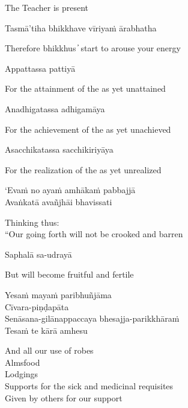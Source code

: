 \begin{cprenglish}
  The Teacher is present
\end{cprenglish}

Tasmā’tiha bhikkhave vīriyaṁ ārabhatha

\begin{cprenglish}
  Therefore bhikkhus  ̓  start to arouse your energy
\end{cprenglish}

Appattassa pattiyā

\begin{cprenglish}
  For the attainment of the as yet unattained
\end{cprenglish}

Anadhigatassa adhigamāya

\begin{cprenglish}
  For the achievement of the as yet unachieved
\end{cprenglish}

Asacchikatassa sacchikiriyāya

\begin{cprenglish}
  For the realization of the as yet unrealized
\end{cprenglish}

‘Evaṁ no ayaṁ amhākaṁ pabbajjā\\
Avaṅkatā avañjhāi bhavissati

\begin{cprenglish}
  Thinking thus:\\
  “Our going forth will not be crooked and barren
\end{cprenglish}

Saphalā sa-udrayā

\begin{cprenglish}
  But will become fruitful and fertile
\end{cprenglish}

Yesaṁ mayaṁ paribhuñjāma\\
Cīvara-piṇḍapāta\\
Senāsana-gilānappaccaya bhesajja-parikkhāraṁ\\
Tesaṁ te kārā amhesu

\begin{cprenglish}
  And all our use of robes\\
  Almsfood\\
  Lodgings\\
  Supports for the sick and medicinal requisites\\
  Given by others for our support
\end{cprenglish}

